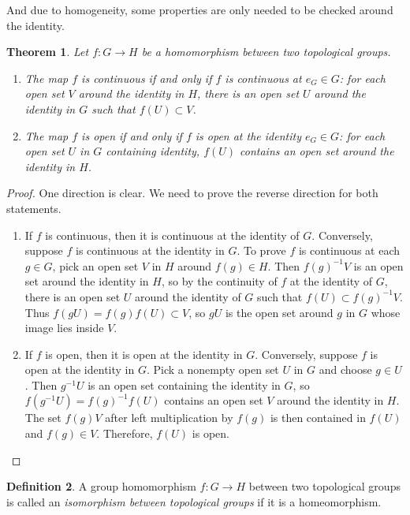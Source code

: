 \documentclass[12pt]{report}
\newtheorem{theorem}{Theorem}[section]
\theoremstyle{definition}
\newtheorem{definition}[theorem]{Definition}
\begin{document}
And due to homogeneity, some properties are only needed to be checked around the identity.

\begin{theorem}
	Let $f:G\to H$ be a homomorphism between two topological groups.
	\begin{enumerate}
		\item The map $f$ is continuous if and only if $f$ is continuous at $e_G\in G$: for each open set $V$ around the identity in $H$, there is an open set $U$ around the identity in $G$ such that $f(U)\subset V$.
		\item The map $f$ is open if and only if $f$ is open at the identity $e_G\in G$: for each open set $U$ in $G$ containing identity, $f(U)$ contains an open set around the identity in $H$.
	\end{enumerate}
\end{theorem}

\begin{proof}
	One direction is clear. We need to prove the reverse direction for both statements.
	\begin{enumerate}
		\item If $f$ is continuous, then it is continuous at the identity of $G$. Conversely, suppose $f$ is continuous at the identity in $G$. To prove $f$ is continuous at each $g\in G$, pick an open set $V$ in $H$ around $f(g)\in H$. Then $f(g)^{-1}V$ is an open set around the identity in $H$, so by the continuity of $f$ at the identity of $G$, there is an open set $U$ around the identity of $G$ such that $f(U)\subset f(g)^{-1}V$. Thus $f(gU)=f(g)f(U)\subset V$, so $gU$ is the open set around $g$ in $G$ whose image lies inside $V$.
		\item If $f$ is open, then it is open at the identity in $G$. Conversely, suppose $f$ is open at the identity in $G$. Pick a nonempty open set $U$ in $G$ and choose $g\in U$. Then $g^{-1}U$ is an open set containing the identity in $G$, so $f(g^{-1}U)=f(g)^{-1}f(U)$ contains an open set $V$ around the identity in $H$. The set $f(g)V$ after left multiplication by $f(g)$ is then contained in $f(U)$ and $f(g)\in V$. Therefore, $f(U)$ is open.
	\end{enumerate}
\end{proof}

\begin{definition}
	A group homomorphism $f:G\to H$ between two topological groups is called an \emph{isomorphism between topological groups} if it is a homeomorphism.
\end{definition}
\end{document}
